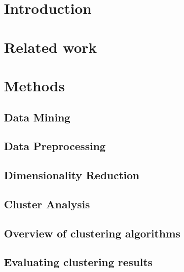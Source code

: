 \section{Introduction}
\label{section:Introduction}




\section{Related work}
\label{section:RelatedWork}




\section{Methods}
\label{section:Theory}
% 

  \subsection{Data Mining}
  \label{section:TheoryDataMining}
  
    
  \subsection{Data Preprocessing}
  \label{section:TheoryDataPreprocessing}
  

  \subsection{Dimensionality Reduction}
  \label{section:TheoryDimensionalityReduction}
  
  
  \subsection{Cluster Analysis}
  \label{section:TheoryClusterAnalysis}
  

  \subsection{Overview of clustering algorithms}
  \label{section:TheoryOverviewClusteringAlgorithms}
  

  \subsection{Evaluating clustering results}
  \label{section:TheoryEvaluatingClusteringResults}
  


